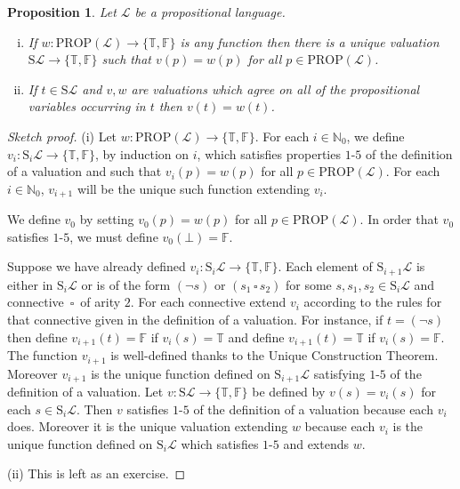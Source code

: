 \documentclass[11pt]{article}
\newcommand{\PROP}{\mathrm{PROP}}
\newcommand{\PF}{\mathrm{S}}
\newtheorem{proposition}[theorem]{Proposition}
\newcommand{\mcal}[1]{\mathcal{#1}}
\newcommand{\N}{\mathbb{N}}
\newcommand{\F}{\mathbb{F}}
\newcommand{\conn}{\,\square\,}
\newcommand{\T}{\mathbb{T}}
\begin{document}
\begin{proposition}
Let $\mcal{L}$ be a propositional language.
\begin{enumerate}[(i)]
\item If $w:\PROP(\mcal{L})\rightarrow \{\T,\F\}$ is any function then there is a unique valuation $\PF\mcal{L}\rightarrow \{\T,\F\}$ such that $v(p)=w(p)$ for all $p\in\PROP(\mcal{L})$.
\item If $t\in \PF\mcal{L}$ and $v,w$ are valuations which agree on all of the propositional variables occurring in $t$ then $v(t)=w(t)$.
\end{enumerate}
\end{proposition}
\begin{proof}[Sketch proof]
(i) Let $w:\PROP(\mcal{L})\rightarrow \{\T,\F\}$. For each $i\in \N_0$, we define $v_i:\PF_i\mcal{L}\rightarrow \{\T,\F\}$, by induction on $i$, which satisfies properties $1$-$5$ of the definition of a valuation and such that $v_i(p)=w(p)$ for all $p\in\PROP(\mcal{L})$. For each $i\in\N_0$, $v_{i+1}$ will be the unique such function extending $v_i$.

We define $v_0$ by setting $v_0(p)=w(p)$ for all $p\in\PROP(\mcal{L})$. In order that $v_0$ satisfies $1$-$5$, we must define $v_0(\bot)=\F$.

Suppose we have already defined $v_i:\PF_i\mcal{L}\rightarrow \{\T,\F\}$. Each element of $\PF_{i+1}\mcal{L}$ is either in $\PF_i\mcal{L}$ or is of the form $(\neg s)$ or $(s_1\conn s_2)$ for some $s, s_1,s_2\in \PF_i\mcal{L}$ and connective  $\conn$ of arity $2$. For each connective extend $v_i$ according to the rules for that connective given in the definition of a valuation. For instance, if $t=(\neg s)$ then define $v_{i+1}(t)=\F$ if $v_i(s)=\T$ and define $v_{i+1}(t)=\T$ if $v_i(s)=\F$. The function $v_{i+1}$ is well-defined thanks to the Unique Construction Theorem. Moreover $v_{i+1}$ is the unique function defined on $\PF_{i+1}\mcal{L}$ satisfying $1$-$5$ of the definition of a valuation. Let $v:\PF\mcal{L}\rightarrow \{\T,\F\}$ be defined by $v(s)=v_i(s)$ for each $s\in\PF_i\mcal{L}$. Then $v$ satisfies $1$-$5$ of the definition of a valuation because each $v_i$ does. Moreover it is the unique valuation extending $w$ because each $v_i$ is the unique function defined on $\PF_i\mcal{L}$ which satisfies $1$-$5$ and extends $w$.
\medskip


\noindent
(ii) This is left as an exercise.
\end{proof}
\end{document}
